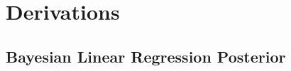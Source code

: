 \documentclass[msc,deptreport.inf]{infthesis} %
\begin{document}
%
%




 \appendix
 
 \chapter{Derivations}
 
 \section{Bayesian Linear Regression Posterior}\label{app:bayesian_linear_regression_posterior}
 
\end{document}

